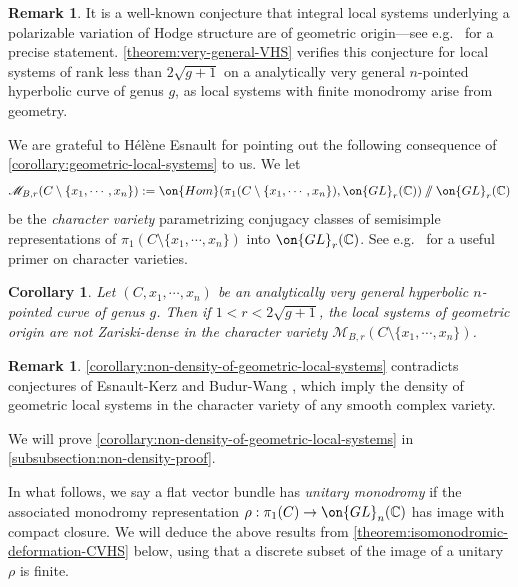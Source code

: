 \documentclass[12 pt]{amsart}
\theoremstyle{plain}
\newtheorem{corollary}[subsubsection]{Corollary}
\theoremstyle{definition}
\newtheorem{remark}[subsubsection]{Remark}
\theoremstyle{remark}
\numberwithin{equation}{section}
\begin{document}
\begin{remark}
    It is a well-known conjecture that integral local systems underlying a polarizable variation of Hodge structure are of geometric origin---see e.g.~\cite[Conjecture 12.4]{simpson62hodge} for a precise statement. \autoref{theorem:very-general-VHS} verifies this conjecture for local systems of rank less than $2\sqrt{g+1}$ on a analytically very general $n$-pointed hyperbolic curve of genus $g$, as local systems with finite monodromy arise from geometry.
\end{remark}	
	
We are grateful to H\'el\`ene Esnault for pointing out the following consequence of \autoref{corollary:geometric-local-systems} to us. We let $$\mathscr{M}_{B,r}(C\setminus \{x_1, \cdots, x_n\}):=\on{Hom}(\pi_1(C\setminus\{x_1, \cdots, x_n\}), \on{GL}_r(\mathbb{C}))\sslash \on{GL}_r(\mathbb{C})$$ be the \emph{character variety} parametrizing conjugacy classes of semisimple representations of $\pi_1(C\setminus \{x_1, \cdots, x_n\})$ into $\on{GL}_r(\mathbb{C})$. See e.g.~\cite{sikora2012character} for a useful primer on character varieties.
\begin{corollary}
    \label{corollary:non-density-of-geometric-local-systems}
    Let $(C, x_1, \cdots, x_n)$ be an analytically very general hyperbolic $n$-pointed curve of genus $g$. Then if $1<r<2\sqrt{g+1}$, the local systems of geometric origin are not Zariski-dense in the character variety $\mathscr{M}_{B,r}(C\setminus \{x_1, \cdots, x_n\})$.
\end{corollary}

\begin{remark}
     \autoref{corollary:non-density-of-geometric-local-systems} contradicts conjectures of Esnault-Kerz \cite[Conjecture 1.1]{esnault2021local} and Budur-Wang \cite[Conjecture 10.3.1]{budur2020absolute}, which imply the density of geometric local systems in the character variety of any smooth complex variety.
\end{remark}



We will prove \autoref{corollary:non-density-of-geometric-local-systems} in 
\autoref{subsubsection:non-density-proof}.

In what follows, we say a flat vector bundle has \emph{unitary monodromy} if the associated monodromy representation
$\rho:\pi_1(C)\to \on{GL}_n(\mathbb{C})$
has image with compact closure.
We will deduce the above results from
\autoref{theorem:isomonodromic-deformation-CVHS} below,
using that a discrete subset of the image of a unitary $\rho$ is finite.
\end{document}

